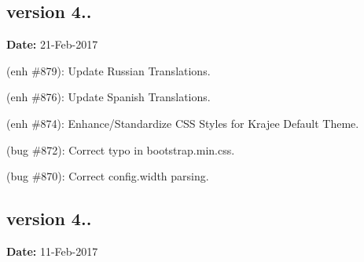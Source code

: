 \subsection*{version 4..}

{\bfseries Date\+:} 21-\/\+Feb-\/2017


\begin{DoxyItemize}
\item (enh \#879)\+: Update Russian Translations.
\item (enh \#876)\+: Update Spanish Translations.
\item (enh \#874)\+: Enhance/\+Standardize C\+SS Styles for Krajee Default Theme.
\item (bug \#872)\+: Correct typo in {\ttfamily bootstrap.\+min.\+css}.
\item (bug \#870)\+: Correct config.\+width parsing.
\end{DoxyItemize}

\subsection*{version 4..}

{\bfseries Date\+:} 11-\/\+Feb-\/2017


